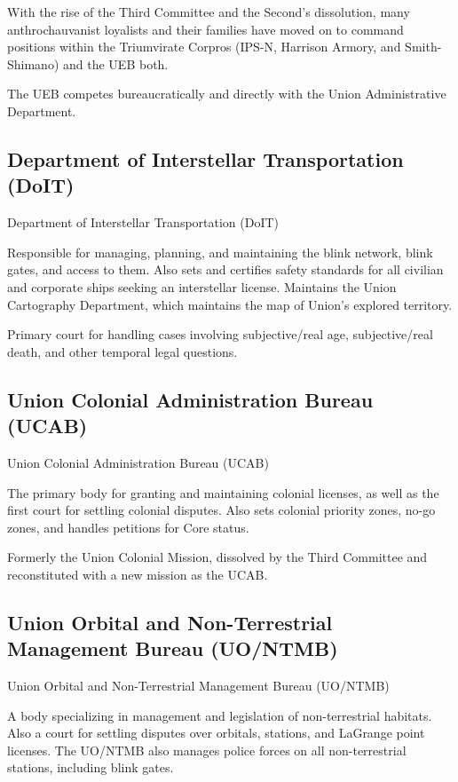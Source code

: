 With the rise of the Third Committee and the Second’s dissolution, many anthrochauvanist
loyalists and their families have moved on to command positions within the Triumvirate Corpros
(IPS-N, Harrison Armory, and Smith-Shimano) and the UEB both.


The UEB competes bureaucratically and directly with the Union Administrative Department.

\subsection{Department of Interstellar Transportation (DoIT)}
Department of Interstellar Transportation (DoIT)




Responsible for managing, planning, and maintaining the blink network, blink gates, and access
to them. Also sets and certifies safety standards for all civilian and corporate ships seeking an
interstellar license. Maintains the Union Cartography Department, which maintains the map of
Union’s explored territory.


Primary court for handling cases involving subjective/real age, subjective/real death, and other
temporal legal questions.

\subsection{Union Colonial Administration Bureau (UCAB)}
Union Colonial Administration Bureau (UCAB)

The primary body for granting and maintaining colonial licenses, as well as the first court for
settling colonial disputes. Also sets colonial priority zones, no-go zones, and handles petitions
for Core status.


Formerly the Union Colonial Mission, dissolved by the Third Committee and reconstituted with a
new mission as the UCAB.

\subsection{Union Orbital and Non-Terrestrial Management Bureau (UO/NTMB) }
Union Orbital and Non-Terrestrial Management Bureau (UO/NTMB)

A body specializing in management and legislation of non-terrestrial habitats. Also a court for
settling disputes over orbitals, stations, and LaGrange point licenses. The UO/NTMB also
manages police forces on all non-terrestrial stations, including blink gates.

